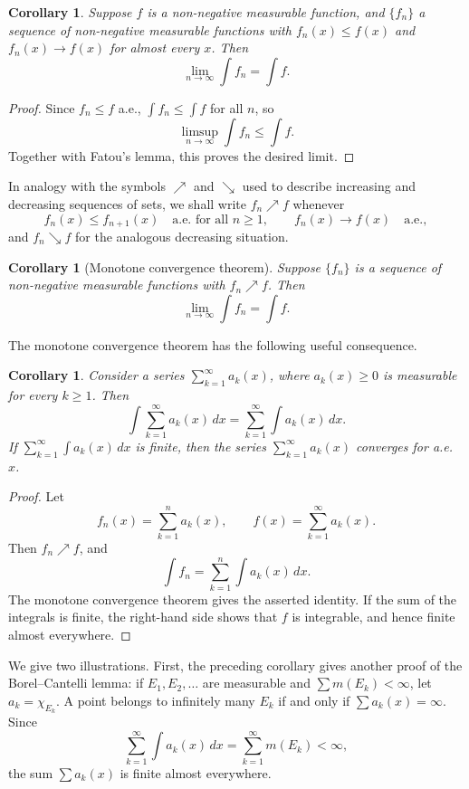 \documentclass[11pt,openany]{book}
\newtheorem{corollary}[theorem]{Corollary}
\begin{document}
\begin{corollary}
Suppose $f$ is a non-negative measurable function, and $\{f_n\}$ a sequence of non-negative measurable functions with $f_n(x)\leq f(x)$ and $f_n(x)\to f(x)$ for almost every $x$. Then
\[
\lim_{n\to\infty}\int f_n=\int f.
\]
\end{corollary}

\begin{proof}
Since $f_n\leq f$ a.e., $\int f_n\leq\int f$ for all $n$, so
\[
\limsup_{n\to\infty}\int f_n\leq\int f.
\]
Together with Fatou's lemma, this proves the desired limit.
\end{proof}

In analogy with the symbols $\nearrow$ and $\searrow$ used to describe increasing and decreasing sequences of sets, we shall write $f_n\nearrow f$ whenever
\[
f_n(x)\leq f_{n+1}(x)\quad\text{a.e. for all }n\geq1,
\qquad
f_n(x)\to f(x)\quad\text{a.e.},
\]
and $f_n\searrow f$ for the analogous decreasing situation.

\begin{corollary}[Monotone convergence theorem]
Suppose $\{f_n\}$ is a sequence of non-negative measurable functions with $f_n\nearrow f$. Then
\[
\lim_{n\to\infty}\int f_n=\int f.
\]
\end{corollary}

The monotone convergence theorem has the following useful consequence.

\begin{corollary}
Consider a series $\sum_{k=1}^{\infty}a_k(x)$, where $a_k(x)\geq0$ is measurable for every $k\geq1$. Then
\[
\int\sum_{k=1}^{\infty}a_k(x)\,dx
=\sum_{k=1}^{\infty}\int a_k(x)\,dx.
\]
If $\sum_{k=1}^{\infty}\int a_k(x)\,dx$ is finite, then the series $\sum_{k=1}^{\infty}a_k(x)$ converges for a.e. $x$.
\end{corollary}

\begin{proof}
Let
\[
f_n(x)=\sum_{k=1}^{n}a_k(x),
\qquad
f(x)=\sum_{k=1}^{\infty}a_k(x).
\]
Then $f_n\nearrow f$, and
\[
\int f_n=\sum_{k=1}^{n}\int a_k(x)\,dx.
\]
The monotone convergence theorem gives the asserted identity. If the sum of the integrals is finite, the right-hand side shows that $f$ is integrable, and hence finite almost everywhere.
\end{proof}

We give two illustrations. First, the preceding corollary gives another proof of the Borel--Cantelli lemma: if $E_1,E_2,\ldots$ are measurable and $\sum m(E_k)<\infty$, let $a_k=\chi_{E_k}$. A point belongs to infinitely many $E_k$ if and only if $\sum a_k(x)=\infty$. Since
\[
\sum_{k=1}^{\infty}\int a_k(x)\,dx=\sum_{k=1}^{\infty}m(E_k)<\infty,
\]
the sum $\sum a_k(x)$ is finite almost everywhere.
\end{document}
